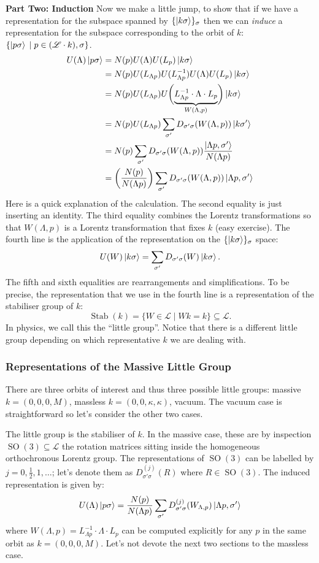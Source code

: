 \documentclass[10pt]{article}
\newcommand{\ms}{\mathscr}
\newcommand{\sg}{\sigma}
\newcommand{\FR}[2]{\frac{#1}{#2}}
\newcommand{\PFR}[2]{\left(\frac{#1}{#2}\right)}
\theoremstyle{plain}
\theoremstyle{definition}
\theoremstyle{remark}
\DeclareMathOperator{\SO}{SO}
\DeclareMathOperator{\Stab}{Stab}
\def\seq{\subseteq}
\begin{document}
\textbf{Part Two: Induction}
Now we make a little jump, to show that if we have a representation for the
subspace spanned by $\{\ket{k\sg}\}_{\sg}$ then we can \emph{induce} a
representation for the subspace corresponding to the orbit of $k$:
$\{\ket{p\sg} \;|\; p\in(\ms L\cdot k), \sg \}$.
\begin{align*}
    U(\Lambda)\ket{p\sg}
&= N(p)U(\Lambda)U(L_p)\ket{k\sg}\\
&= N(p)U(L_{\Lambda p})U(L^{-1}_{\Lambda p})U(\Lambda)U(L_p)\ket{k\sg}\\
&= N(p)U(L_{\Lambda p})U\biggl(\underbrace{L^{-1}_{\Lambda p}\cdot\Lambda\cdot
L_p}_{W(\Lambda,p)}\biggr)\ket{k\sg}\\
&= N(p) U(L_{\Lambda p}) \sum_{\sg'} D_{\sg'\sg}(W(\Lambda,p)) \ket{k\sg'}\\
&= N(p) \sum_{\sg'} D_{\sg'\sg}(W(\Lambda,p)) \FR{\ket{\Lambda
p,\sg'}}{N(\Lambda p)}\\
&= \PFR{N(p)}{N(\Lambda p)} \sum_{\sg'} D_{\sg'\sg}(W(\Lambda,p))
\ket{\Lambda p,\sg'}
\end{align*}
Here is a quick explanation of the calculation. The second equality is
just inserting an identity. The third equality combines the Lorentz
transformations so that $W(\Lambda,p)$ is a Lorentz transformation
that fixes $k$ (easy exercise). The fourth line is the application of
the representation on the $\{\ket{k\sg}\}_{\sg}$ space: \[U(W)
\ket{k\sg} = \sum_{\sg'} D_{\sg'\sg}(W)\ket{k\sg}.\] The fifth and
sixth equalities are rearrangements and simplifications. To be
precise, the representation that we use in the fourth line is a
representation of the stabiliser group of $k$: \[\Stab(k)=\{W\in\ms
L\;|\;Wk=k\}\seq\ms L.\] In physics, we call this the ``little
group''. Notice that there is a different little group depending on
which representative $k$ we are dealing with.

\subsubsection{Representations of the Massive Little Group}
There are three orbits of interest and thus three possible little
groups: massive $k=(0,0,0,M)$, massless $k=(0,0,\kappa,\kappa)$,
vacuum. The vacuum case is straightforward so let's consider the other
two cases.

The little group is the stabiliser of $k$. In the massive case, these
are by inspection $\SO(3)\seq \ms L$ the rotation matrices sitting
inside the homogeneous orthochronous Lorentz group. The
representations of $\SO(3)$ can be labelled by $j=0, \FR{1}{2}, 1,
\dots$; let's denote them as $D^{(j)}_{\sg'\sg}(R)$ where $R \in
\SO(3)$. The induced representation is given by:
\[ U(\Lambda)\ket{p\sg} = \FR{N(p)}{N(\Lambda p)} \sum_{\sg'}
D^{(j)}_{\sg'\sg}(W_{\Lambda,p})\ket{\Lambda p,\sg'}\]
where $W(\Lambda,p) = L^{-1}_{\Lambda p}\cdot\Lambda \cdot L_p$ can be
computed explicitly for any $p$ in the same orbit as $k = (0,0,0,M)$.
Let's not devote the next two sections to the massless case.
\end{document}
